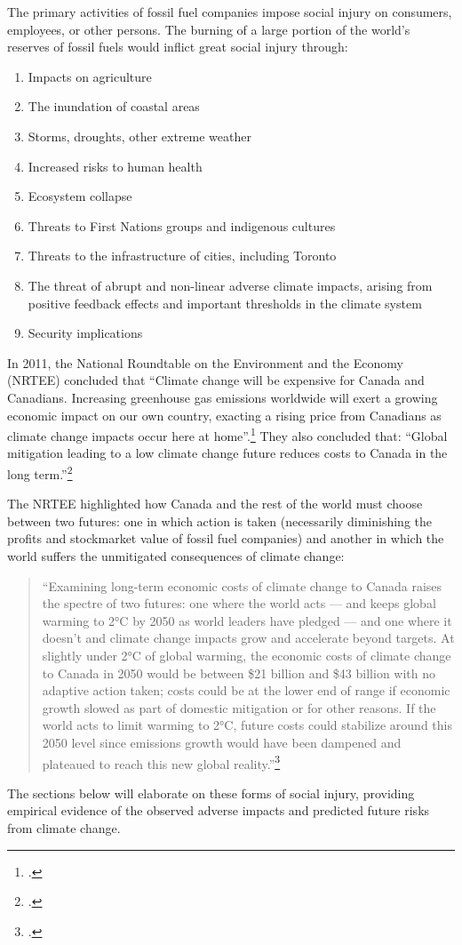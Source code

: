 The primary activities of fossil fuel companies impose social injury on consumers, employees, or other persons.
The burning of a large portion of the world's reserves of fossil fuels would inflict great social injury through:
\begin{enumerate}
\item Impacts on agriculture
\item The inundation of coastal areas
\item Storms, droughts, other extreme weather
\item Increased risks to human health
\item Ecosystem collapse 
\item Threats to First Nations groups and indigenous cultures
\item Threats to the infrastructure of cities, including Toronto
\item The threat of abrupt and non-linear adverse climate impacts, arising from positive feedback effects and important thresholds in the climate system
\item Security implications
\end{enumerate}
In 2011, the National Roundtable on the Environment and the Economy (NRTEE) concluded that ``Climate change will be expensive for Canada and Canadians. Increasing greenhouse gas emissions worldwide will exert a growing economic impact on our own country, exacting a rising price from Canadians as climate change impacts occur here at home''.\footcite[][p.15]{NRTEEPrice}
They also concluded that: ``Global mitigation leading to a low climate change future reduces costs to Canada in the long term.''\footcite[][p.16]{NRTEEPrice}



The NRTEE highlighted how Canada and the rest of the world must choose between two futures: one in which action is taken (necessarily diminishing the profits and stockmarket value of fossil fuel companies) and another in which the world suffers the unmitigated consequences of climate change:
\begin{quote}
``Examining long-term economic costs of climate change to Canada raises the spectre of two futures: one where the world acts — and keeps global warming to 2°C by 2050 as world leaders have pledged — and one where it doesn't and climate change impacts grow and accelerate beyond targets. At slightly under 2°C of global warming, the economic costs of climate change to Canada in 2050 would be between \$21 billion and \$43 billion with no adaptive action taken; costs could be at the lower end of range if economic growth slowed as part of domestic mitigation or for other reasons. If the world acts to limit warming to 2°C, future costs could stabilize around this 2050 level since emissions growth would have been dampened and plateaued to reach this new global reality.''\footcite[][p.18]{NRTEEPrice}
\end{quote}
The sections below will elaborate on these forms of social injury, providing empirical evidence of the observed adverse impacts and predicted future risks from climate change.



